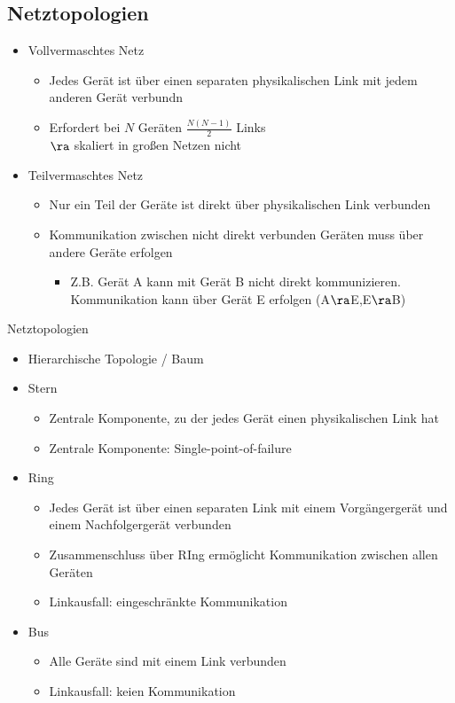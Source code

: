   \subsection{Netztopologien}
    \begin{itemize}
      \item Vollvermaschtes Netz
        \begin{itemize}
          \item Jedes Gerät ist über einen separaten physikalischen Link mit jedem anderen Gerät
            verbundn
          \item Erfordert bei $N$ Geräten $\frac{N(N-1)}{2}$ Links\\
            $\ra$ skaliert in großen Netzen nicht
        \end{itemize}
      \item Teilvermaschtes Netz
        \begin{itemize}
          \item Nur ein Teil der Geräte ist direkt über physikalischen Link verbunden
          \item Kommunikation zwischen nicht direkt verbunden Geräten muss über andere Geräte erfolgen
            \begin{itemize}
              \item Z.B. Gerät A kann mit Gerät B nicht direkt kommunizieren. Kommunikation kann
                über Gerät E erfolgen (A$\ra$E,E$\ra$B)
            \end{itemize}
        \end{itemize}
    \end{itemize}
    Netztopologien
    \begin{itemize}
      \item Hierarchische Topologie / Baum
      \item Stern
        \begin{itemize}
          \item Zentrale Komponente, zu der jedes Gerät einen physikalischen Link hat
          \item Zentrale Komponente: Single-point-of-failure
        \end{itemize}
      \item Ring
        \begin{itemize}
          \item Jedes Gerät ist über einen separaten Link mit einem Vorgängergerät und einem
            Nachfolgergerät verbunden
          \item Zusammenschluss über RIng ermöglicht Kommunikation zwischen allen Geräten
          \item Linkausfall: eingeschränkte Kommunikation
        \end{itemize}
      \item Bus
        \begin{itemize}
          \item Alle Geräte sind mit einem Link verbunden
          \item Linkausfall: keien Kommunikation
        \end{itemize}
    \end{itemize}
